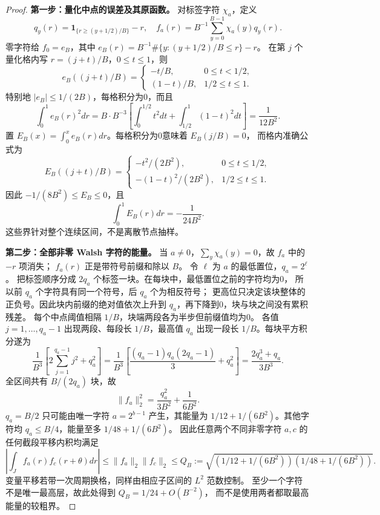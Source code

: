 \begin{proof}
\textbf{第一步：量化中点的误差及其原函数。}
对标签字符 $\chi_a$，定义
\[
 q_y(r)=\mathbf1_{\{r\ge(y+1/2)/B\}}-r,
 \quad f_a(r)=B^{-1}\sum_{y=0}^{B-1}\chi_a(y)q_y(r).
\]
零字符给 $f_0=e_B$，其中
$e_B(r)=B^{-1}\#\{y:(y+1/2)/B\le r\}-r$。
在第 $j$ 个量化格内写 $r=(j+t)/B$，$0\le t\le1$，则
\[
 e_B((j+t)/B)=\begin{cases}-t/B,&0\le t<1/2,\\(1-t)/B,&1/2\le t\le1.
 \end{cases}
\]
特别地 $|e_B|\le1/(2B)$，每格积分为0，而且
\[
 \int_0^1e_B(r)^2dr
 =B\cdot B^{-3}\left[\int_0^{1/2}t^2dt+
 \int_{1/2}^1(1-t)^2dt\right]=\frac1{12B^2}.
\]
置 $E_B(x)=\int_0^xe_B(r)dr$。每格积分为0意味着 $E_B(j/B)=0$，
而格内准确公式为
\[
 E_B((j+t)/B)=\begin{cases}-t^2/(2B^2),&0\le t\le1/2,\\
 -(1-t)^2/(2B^2),&1/2\le t\le1.
 \end{cases}
\]
因此 $-1/(8B^2)\le E_B\le0$，且
\[
 \int_0^1E_B(r)dr=-\frac1{24B^2}.
\]
这些界针对整个连续区间，不是离散节点抽样。

\textbf{第二步：全部非零 Walsh 字符的能量。}
当 $a\ne0$，$\sum_y\chi_a(y)=0$，故 $f_a$ 中的 $-r$ 项消失；
$f_a(r)$ 正是带符号前缀和除以 $B$。
令 $\ell$ 为 $a$ 的最低置位，$q_a=2^\ell$。
把标签顺序分成 $2q_a$ 个标签一块。在每块中，最低置位之前的字符均为0，
所以前 $q_a$ 个字符具有同一个符号，后 $q_a$ 个为相反符号；
更高位只决定该块整体的正负号。因此块内前缀的绝对值依次上升到
$q_a$，再下降到0，块与块之间没有累积残差。
每个中点阈值相隔 $1/B$，块端两段各为半步但前缀值均为0。
各值 $j=1,\ldots,q_a-1$ 出现两段、每段长 $1/B$，最高值 $q_a$
出现一段长 $1/B$。每块平方积分遂为
\[
 \frac1{B^3}\left[2\sum_{j=1}^{q_a-1}j^2+q_a^2\right]
 =\frac1{B^3}\left[\frac{(q_a-1)q_a(2q_a-1)}3+q_a^2\right]
 =\frac{2q_a^3+q_a}{3B^3}.
\]
全区间共有 $B/(2q_a)$ 块，故
\begin{equation}\label{eq:paperwalshenergy}
 \|f_a\|_2^2=\frac{q_a^2}{3B^2}+\frac1{6B^2}.
\end{equation}
$q_a=B/2$ 只可能由唯一字符 $a=2^{b-1}$ 产生，其能量为
$1/12+1/(6B^2)$。其他字符均 $q_a\le B/4$，能量至多
$1/48+1/(6B^2)$。
因此任意两个不同非零字符 $a,c$ 的任何截段平移内积均满足
\[
 |\int_J f_a(r)f_c(r+\theta)dr|
 \le\|f_a\|_2\|f_c\|_2
 \le Q_B:=\sqrt{(1/12+1/(6B^2))(1/48+1/(6B^2))}.
\]
变量平移若带一次周期换格，同样由相应子区间的 $L^2$ 范数控制。
至少一个字符不是唯一最高层，故此处得到 $Q_B=1/24+O(B^{-2})$，
而不是使用两者都取最高能量的较粗界。


\end{proof}
